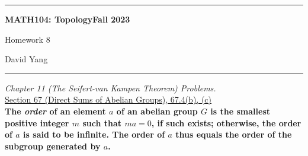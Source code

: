 \documentclass[11pt]{article}
\begin{document}
	\hrule
	\begin{center}
        \textbf{MATH104: Topology}\hfill \textbf{Fall 2023}\newline

		{\Large Homework 8}

		David Yang
	\end{center}

\hrule

\vspace{1em}

\textit{Chapter 11 (The Seifert-van Kampen Theorem) Problems.} \\

\underline{Section 67 (Direct Sums of Abelian Groups), 67.4(b), (c)} \\

\textbf{The \textit{order} of an element $a$ of an abelian group $G$ is the smallest positive integer $m$ such that $ma = 0$, if such exists; otherwise, the order of $a$ is said to be infinite.
The order of $a$ thus equals the order of the subgroup generated by $a$.}
\end{document}

